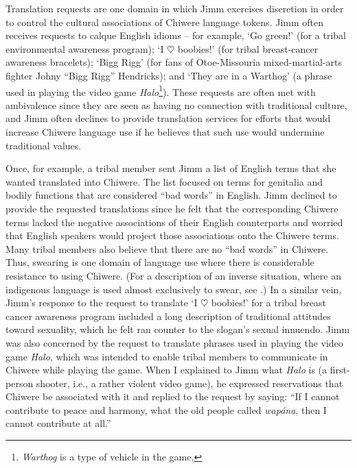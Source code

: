 \documentclass[output=paper]{LSP/langsci}
\begin{document}
Translation requests are one domain in which Jimm exercises discretion in order to control the cultural associations of Chiwere language tokens. Jimm often receives requests to calque English idioms -- for example, `Go green!' (for a tribal environmental awareness program); `I $\heartsuit$ boobies!' (for tribal breast-cancer awareness bracelets); `Bigg Rigg' (for fans of Otoe-Missouria mixed-martial-arts fighter Johny ``Bigg Rigg'' Hendricks); and `They are in a Warthog' (a phrase used in playing the video game \emph{Halo}\footnote{\emph{Warthog} is a type of vehicle in the game.}). These requests are often met with ambivalence since they are seen as having no connection with traditional culture, and Jimm often declines to provide translation services for efforts that would increase Chiwere language use if he believes that such use would undermine traditional values.

Once, for example, a tribal member sent Jimm a list of English terms that she wanted translated into Chiwere. The list focused on terms for genitalia and bodily functions that are considered ``bad words'' in English. Jimm declined to provide the requested translations since he felt that the corresponding Chiwere terms lacked the negative associations of their English counterparts and worried that English speakers would project those associations onto the Chiwere terms. Many tribal members also believe that there are no ``bad words'' in Chiwere. Thus, swearing is one domain of language use where there is considerable resistance to using Chiwere. (For a description of an inverse situation, where an indigenous language is used almost exclusively to swear, see \citealt{Muehlmann2008}.) In a similar vein, Jimm's response to the request to translate `I $\heartsuit$ boobies!' for a tribal breast cancer awareness program included a long description of traditional attitudes toward sexuality, which he felt ran counter to the slogan's sexual innuendo. Jimm was also concerned by the request to translate phrases used in playing the video game \emph{Halo}, which was intended to enable tribal members to communicate in Chiwere while playing the game. When I explained to Jimm what \emph{Halo} is (a first-person shooter, i.e., a rather violent video game), he expressed reservations that Chiwere be associated with it and replied to the request by saying: ``If I cannot contribute to peace and harmony, what the old people called \emph{wapána}, then I cannot contribute at all.''
\end{document}
